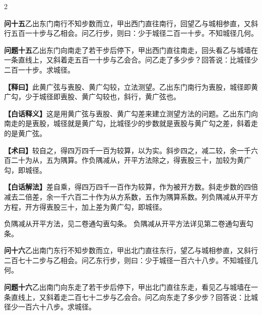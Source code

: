 \documentclass[11pt,a4paper]{article}
\newcommand{\WenQuestion}[1]{\textbf{\textcolor{classicalcolor}{#1}}}
\newcommand{\BaiQuestion}[1]{\textbf{\textcolor{moderncolor}{#1}}}
\newcommand{\WenExplain}{\textcolor{classicalcolor}{\textbf{【释曰】}}}
\newcommand{\BaiExplain}{\textcolor{moderncolor}{\textbf{【白话释义】}}}
\newcommand{\WenMethod}{\textcolor{classicalcolor}{\textbf{【术曰】}}}
\newcommand{\BaiMethod}{\textcolor{moderncolor}{\textbf{【白话解法】}}}
\begin{document}
\begin{paracol}{2}

\switchcolumn*
\begin{tcolorbox}[colback=red!3,colframe=red!30!black,boxrule=0.3pt]
\WenQuestion{问十五}\quad 乙出东门南行不知步数而立，甲出西门直往南行，回望乙与城相参直，又斜行五百一十步与乙相会。问乙行步，则曰：少于城径二百一十步。不知城径几何。
\end{tcolorbox}
\switchcolumn
\begin{tcolorbox}[colback=blue!3,colframe=blue!30!black,boxrule=0.3pt]
\BaiQuestion{问题十五}\quad 乙出东门向南走了若干步后停下，甲出西门直往南走，回头看乙与城墙在一条直线上，又斜着走五百一十步与乙会合。问乙走了多少步？回答说：比城径少二百一十步。求城径。
\end{tcolorbox}

\switchcolumn*
\begin{tcolorbox}[colback=red!5,colframe=red!30!black,boxrule=0.3pt]
\WenExplain\quad 此黄广弦与叀股、黄广勾较，立法测望。乙出东门南行为叀股，城径即黄广勾，少于城径即叀股、黄广勾较也，斜行，黄广弦也。
\end{tcolorbox}
\switchcolumn
\begin{tcolorbox}[colback=blue!5,colframe=blue!30!black,boxrule=0.3pt]
\BaiExplain\quad 这是用黄广弦与叀股、黄广勾差来建立测望方法的问题。乙出东门向南走的是叀股，城径就是黄广勾，比城径少的步数就是叀股与黄广勾之差，斜着走的是黄广弦。
\end{tcolorbox}

\switchcolumn*
\begin{tcolorbox}[colback=red!5,colframe=red!40!black,boxrule=0.3pt]
\WenMethod\quad 较自之，得四万四千一百为较算，以为实。斜步四之，减二较，余一千六百二十为从，五为隅算。作负隅减从，开平方法除之，得叀股三十，加较为黄广勾，即城径。
\end{tcolorbox}
\switchcolumn
\begin{tcolorbox}[colback=blue!5,colframe=blue!40!black,boxrule=0.3pt]
\BaiMethod\quad 差自乘，得四万四千一百作为较算，作为被开方数。斜走步数的四倍减去二倍差，余一千六百二十作为从方系数，五作为隅算系数。列负隅减从开平方方程，开方得叀股三十，加上差为黄广勾，即城径。
\end{tcolorbox}

\switchcolumn*
\small 负隅减从开平方法，见二卷通勾叀勾条。
\switchcolumn
\small 负隅减从开平方法详见第二卷通勾叀勾条。

\vspace{0.8em}

\switchcolumn*
\begin{tcolorbox}[colback=red!3,colframe=red!30!black,boxrule=0.3pt]
\WenQuestion{问十六}\quad 乙出南门东行不知步数而立，甲出北门直往东行，望乙与城相参直，又斜行二百七十二步与乙相会。问乙东行步，则曰：少于城径一百六十八步。不知城径几何。
\end{tcolorbox}
\switchcolumn
\begin{tcolorbox}[colback=blue!3,colframe=blue!30!black,boxrule=0.3pt]
\BaiQuestion{问题十六}\quad 乙出南门向东走了若干步后停下，甲出北门直往东走，看见乙与城墙在一条直线上，又斜着走二百七十二步与乙会合。问乙向东走了多少步？回答说：比城径少一百六十八步。求城径。
\end{tcolorbox}


\end{paracol}
\end{document}
